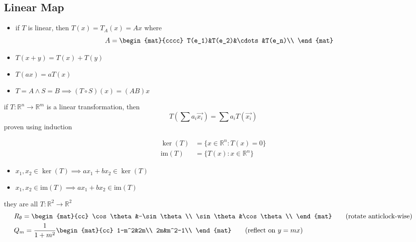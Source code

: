 	\subsection{Linear Map}
	    \begin{definition}
	    	\begin{itemize}
				\item if $T$ is linear, then $T(x)=T_A(x)=Ax$ where
					$$A=\begin{mat}{cccc}
						T(e_1)&T(e_2)&\cdots&T(e_n)\\
					\end{mat}$$
				\item $T(x+y)=T(x)+T(y)$
				\item $T(ax)=aT(x)$
				\item $T=A\land S=B\implies(T\circ S)(x)=(AB)x$
	    	\end{itemize}
	    \end{definition}
		\begin{theorem}[Linearity]
			if $T:\mathbb{R}^n\to\mathbb{R}^m$ is a linear transformation, then
			$$T\left(\sum a_i\vec{x_i}\right)=\sum a_iT(\vec{x_i})$$
			proven using induction
		\end{theorem}
		\begin{definition}
			\begin{align*}
				\ker(T)&=\{x\in\mathbb{R}^n:T(x)=0\}\\
				\mathrm{im}(T)&=\{T(x):x\in\mathbb{R}^n\}
			\end{align*}
			\begin{itemize}
				\item $x_1,x_2\in\ker(T)\implies ax_1+bx_2\in\ker(T)$ 
				\item $x_1,x_2\in\mathrm{im}(T)\implies ax_1+bx_2\in\mathrm{im}(T)$ 
			\end{itemize}
		\end{definition}
		\begin{theorem}
			they are all $T:\mathbb{R}^2\to\mathbb{R}^2$
			\begin{align*}
				&R_\theta=\begin{mat}{cc}
					\cos\theta&-\sin\theta\\
					\sin\theta&\cos\theta\\
				\end{mat}\tag*{(rotate anticlock-wise)}\\
				&Q_m=\frac1{1+m^2}\begin{mat}{cc}
					1-m^2&2m\\
					2m&m^2-1\\
				\end{mat}\tag*{(reflect on $y=mx$)}
			\end{align*}
		\end{theorem}
